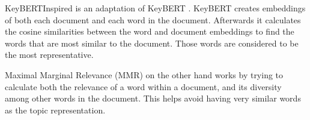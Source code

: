KeyBERTInspired is an adaptation of KeyBERT \citep{grootendorst2020keybert}. KeyBERT creates embeddings of both each document and each word in the document. Afterwards it calculates the cosine similarities between the word and document embeddings to find the words that are most similar to the document. Those words are considered to be the most representative.

Maximal Marginal Relevance (MMR) \citep{10.1145/290941.291025} on the other hand works by trying to calculate both the relevance of a word within a document, and its diversity among other words in the document. This helps avoid having very similar words as the topic representation.
